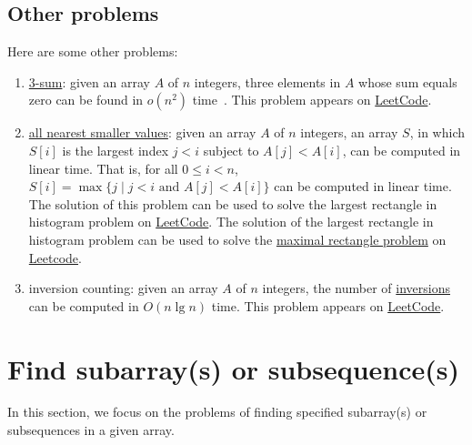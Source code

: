 \subsection{Other problems}
Here are some other problems:
\begin{enumerate}
\item \href{https://en.wikipedia.org/wiki/3SUM}{3-sum}: given an array $A$ of $n$ integers, three elements in $A$ whose sum equals zero can be found in $o(n^2)$ time~\cite{Jorgensen2014}. This problem appears on \href{https://leetcode.com/problems/3sum/}{LeetCode}.
\item \href{https://en.wikipedia.org/wiki/All_nearest_smaller_values}{all nearest smaller values}: given an array $A$ of $n$ integers, an array $S$, in which $S[i]$ is the largest index $j < i$ subject to $A[j] < A[i]$, can be computed in linear time. That is, for all $0 \leq i < n$, $S[i] = \max \{ j \mid j < i \text{ and } A[j] < A[i] \}$ can be computed in linear time. The solution of this problem can be used to solve the largest rectangle in histogram problem on \href{https://leetcode.com/problems/largest-rectangle-in-histogram/}{LeetCode}. The solution of the largest rectangle in histogram problem can be used to solve the \href{http://www.drdobbs.com/database/the-maximal-rectangle-problem/184410529}{maximal rectangle problem} on \href{https://leetcode.com/problems/maximal-rectangle/}{Leetcode}.
\item inversion counting: given an array $A$ of $n$ integers, the number of \href{https://en.wikipedia.org/wiki/Inversion_(discrete_mathematics)}{inversions} can be computed in $O(n \lg n)$ time. This problem appears on \href{https://leetcode.com/problems/count-of-smaller-numbers-after-self/}{LeetCode}.
\end{enumerate}

\section{Find subarray(s) or subsequence(s)}
In this section, we focus on the problems of finding specified subarray(s) or subsequences in a given array.

